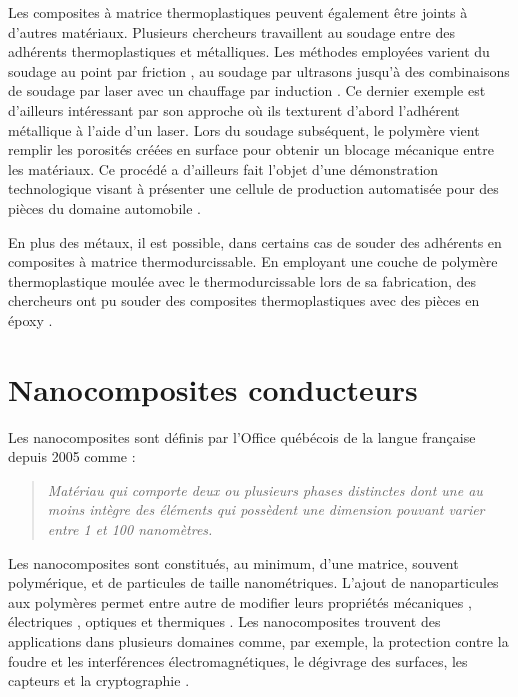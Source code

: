 Les composites à matrice thermoplastiques peuvent également être joints à d'autres matériaux. 
Plusieurs chercheurs travaillent au soudage entre des adhérents thermoplastiques et métalliques. 
Les méthodes employées varient du soudage au point par friction \cite{Goushegir2016}, au soudage par ultrasons \cite{Balle2009,Kruger2004} jusqu'à des combinaisons de soudage par laser avec un chauffage par induction \cite{Weidmann2018}. 
Ce dernier exemple est d'ailleurs intéressant par son approche où ils texturent d'abord l'adhérent métallique à l'aide d'un laser. 
Lors du soudage subséquent, le polymère vient remplir les porosités créées en surface pour obtenir un blocage mécanique entre les matériaux. 
Ce procédé a d'ailleurs fait l'objet d'une démonstration technologique visant à présenter une cellule de production automatisée pour des pièces du domaine automobile \cite{Gardiner2019a}. 

En plus des métaux, il est possible, dans certains cas de souder des adhérents en composites à matrice thermodurcissable. 
En employant une couche de polymère thermoplastique moulée avec le thermodurcissable lors de sa fabrication, des chercheurs ont pu souder des composites thermoplastiques avec des pièces en époxy \cite{Lionetto2018a,FernandezVillegas2015}.

\section{Nanocomposites conducteurs}

Les nanocomposites sont définis par l'Office québécois de la langue française depuis 2005 comme : 

\begin{quote}
	\textit{Matériau qui comporte deux ou plusieurs phases distinctes dont une au moins intègre des éléments qui possèdent une dimension pouvant varier entre 1 et 100 nanomètres.}
\end{quote}

Les nanocomposites sont constitués, au minimum, d'une matrice, souvent polymérique, et de particules de taille nanométriques. 
L'ajout de nanoparticules aux polymères permet entre autre de modifier leurs propriétés mécaniques \cite{Thostenson2002a}, électriques \cite{Zheng2003a}, optiques \cite{Hu2014} et thermiques \cite{Diez-Pascual2009, Al-Saleh2009c}. 
Les nanocomposites trouvent des applications dans plusieurs domaines comme, par exemple, la protection contre la foudre et les interférences électromagnétiques, le dégivrage des surfaces, les capteurs et la cryptographie \cite{Andrews2001, Thostenson2001c, Mittal2014h, Gaztelumendi2017, Chu2014, Hu2016, Al-Saleh2009, Chopra2003}. 

